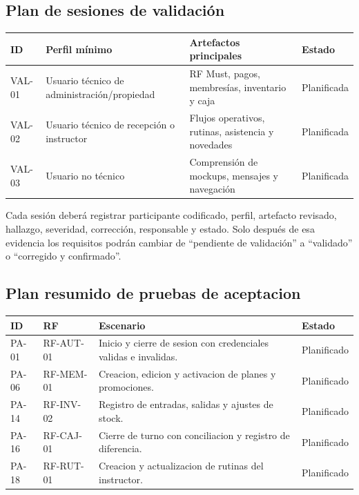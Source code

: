 \documentclass[11pt,a4paper,twoside]{article}
\begin{document}
\subsection{Plan de sesiones de validación}
\begin{tabularx}{\textwidth}{lXll}
\toprule ID & Perfil mínimo & Artefactos principales & Estado \\ \midrule
VAL-01 & Usuario técnico de administración/propiedad & RF Must, pagos, membresías, inventario y caja & Planificada \\
VAL-02 & Usuario técnico de recepción o instructor & Flujos operativos, rutinas, asistencia y novedades & Planificada \\
VAL-03 & Usuario no técnico & Comprensión de mockups, mensajes y navegación & Planificada \\
\bottomrule
\end{tabularx}

Cada sesión deberá registrar participante codificado, perfil, artefacto revisado, hallazgo, severidad, corrección, responsable y estado. Solo después de esa evidencia los requisitos podrán cambiar de ``pendiente de validación'' a ``validado'' o ``corregido y confirmado''.

\subsection{Plan resumido de pruebas de aceptacion}
\begin{tabularx}{\textwidth}{l l X l}
\toprule ID & RF & Escenario & Estado \\ \midrule
PA-01 & RF-AUT-01 & Inicio y cierre de sesion con credenciales validas e invalidas. & Planificado \\
PA-06 & RF-MEM-01 & Creacion, edicion y activacion de planes y promociones. & Planificado \\
PA-14 & RF-INV-02 & Registro de entradas, salidas y ajustes de stock. & Planificado \\
PA-16 & RF-CAJ-01 & Cierre de turno con conciliacion y registro de diferencia. & Planificado \\
PA-18 & RF-RUT-01 & Creacion y actualizacion de rutinas del instructor. & Planificado \\
\bottomrule
\end{tabularx}
\end{document}
